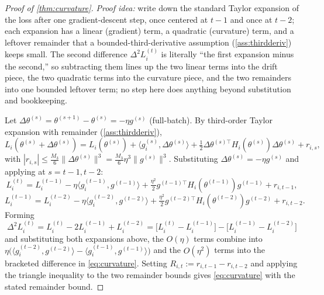 \documentclass{article}
\theoremstyle{plain}
\theoremstyle{definition}
\theoremstyle{remark}
\begin{document}
\begin{proof}[Proof of \cref{thm:curvature}]
\emph{Proof idea:} write down the standard Taylor expansion of the loss after one gradient-descent step, once centered at $t{-}1$ and once at $t{-}2$; each expansion has a linear (gradient) term, a quadratic (curvature) term, and a leftover remainder that a bounded-third-derivative assumption (\cref{ass:thirdderiv}) keeps small. The second difference $\Delta^2 L_i^{(t)}$ is literally ``the first expansion minus the second,'' so subtracting them lines up the two linear terms into the drift piece, the two quadratic terms into the curvature piece, and the two remainders into one bounded leftover term; no step here does anything beyond substitution and bookkeeping.

Let $\Delta\theta^{(s)}=\theta^{(s+1)}-\theta^{(s)}=-\eta g^{(s)}$ (full-batch). By third-order Taylor expansion with remainder (\cref{ass:thirdderiv}),
\[
L_i(\theta^{(s)}+\Delta\theta^{(s)}) = L_i(\theta^{(s)}) + \langle g_i^{(s)},\Delta\theta^{(s)}\rangle + \tfrac12\Delta\theta^{(s)\top}H_i(\theta^{(s)})\Delta\theta^{(s)} + r_{i,s},
\]
with $|r_{i,s}|\le\frac{M_3}6\|\Delta\theta^{(s)}\|^3=\frac{M_3}6\eta^3\|g^{(s)}\|^3$. Substituting $\Delta\theta^{(s)}=-\eta g^{(s)}$ and applying at $s=t-1,t-2$:
\[
L_i^{(t)} = L_i^{(t-1)} - \eta\langle g_i^{(t-1)},g^{(t-1)}\rangle + \tfrac{\eta^2}2 g^{(t-1)\top}H_i(\theta^{(t-1)})g^{(t-1)} + r_{i,t-1},
\]
\[
L_i^{(t-1)} = L_i^{(t-2)} - \eta\langle g_i^{(t-2)},g^{(t-2)}\rangle + \tfrac{\eta^2}2 g^{(t-2)\top}H_i(\theta^{(t-2)})g^{(t-2)} + r_{i,t-2}.
\]
Forming
\[
\Delta^2 L_i^{(t)} = L_i^{(t)}-2L_i^{(t-1)}+L_i^{(t-2)} = \big[L_i^{(t)}-L_i^{(t-1)}\big]-\big[L_i^{(t-1)}-L_i^{(t-2)}\big]
\]
and substituting both expansions above, the $O(\eta)$ terms combine into $\eta\big(\langle g_i^{(t-2)},g^{(t-2)}\rangle-\langle g_i^{(t-1)},g^{(t-1)}\rangle\big)$ and the $O(\eta^2)$ terms into the bracketed difference in \cref{eq:curvature}. Setting $R_{i,t}:=r_{i,t-1}-r_{i,t-2}$ and applying the triangle inequality to the two remainder bounds gives \cref{eq:curvature} with the stated remainder bound.
\end{proof}
\end{document}
